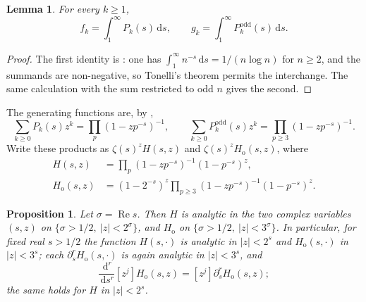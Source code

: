 \documentclass[11pt]{amsart}
\theoremstyle{plain}
\newtheorem{proposition}[theorem]{Proposition}
\newtheorem{lemma}[theorem]{Lemma}
\theoremstyle{definition}
\newcommand{\dd}{\,\mathrm d}
\newcommand{\abs}[1]{\lvert #1\rvert}
\begin{document}
\begin{lemma}\label{lem:integral-representation}
For every $k\geq1$,
\begin{equation}\label{eq:integral-representation}
  f_k=\int_1^\infty P_k(s)\dd s,
  \qquad
  g_k=\int_1^\infty P_k^{\mathrm{odd}}(s)\dd s.
\end{equation}
\end{lemma}

\begin{proof}
The first identity is \cite[(3.1)]{Lichtman19}: one has
$\int_1^\infty n^{-s}\dd s=1/(n\log n)$ for $n\geq2$, and the summands are
non-negative, so Tonelli's theorem permits the interchange. The same
calculation with the sum restricted to odd $n$ gives the second.
\end{proof}

The generating functions are, by \cite[Prop.~3.1]{Lichtman19},
\begin{equation}\label{eq:euler-products}
  \sum_{k\geq0}P_k(s)z^k=\prod_p(1-zp^{-s})^{-1},
  \qquad
  \sum_{k\geq0}P_k^{\mathrm{odd}}(s)z^k
      =\prod_{p\geq3}(1-zp^{-s})^{-1}.
\end{equation}
Write these products as $\zeta(s)^zH(s,z)$ and
$\zeta(s)^zH_{\mathrm o}(s,z)$, where
\begin{align}
  H(s,z)&=\prod_p(1-zp^{-s})^{-1}(1-p^{-s})^z,
       \label{eq:H-full}\\
  H_{\mathrm o}(s,z)&=(1-2^{-s})^z
       \prod_{p\geq3}(1-zp^{-s})^{-1}(1-p^{-s})^z.
       \label{eq:H-odd}
\end{align}

\begin{proposition}\label{prop:analyticity}
Let $\sigma=\operatorname{Re}s$. Then $H$ is analytic in the two complex
variables $(s,z)$ on $\{\sigma>1/2,\ \abs z<2^{\sigma}\}$, and
$H_{\mathrm o}$ on $\{\sigma>1/2,\ \abs z<3^{\sigma}\}$. In particular, for
fixed real $s>1/2$ the function $H(s,\cdot)$ is analytic in $\abs z<2^s$ and
$H_{\mathrm o}(s,\cdot)$ in $\abs z<3^s$; each
$\partial_s^rH_{\mathrm o}(s,\cdot)$ is again analytic in
$\abs z<3^s$, and
\begin{equation}\label{eq:coeff-commute}
  \frac{\dd^r}{\dd s^r}[z^j]H_{\mathrm o}(s,z)
   =[z^j]\partial_s^rH_{\mathrm o}(s,z);
\end{equation}
the same holds for $H$ in $\abs z<2^s$.
\end{proposition}
\end{document}
